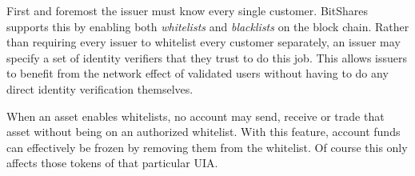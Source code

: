 First and foremost the issuer must know every single customer. BitShares
supports this by enabling both \emph{whitelists} and \emph{blacklists} on the
block chain. Rather than requiring every issuer to whitelist every customer
separately, an issuer may specify a set of identity verifiers that they trust
to do this job. This allows issuers to benefit from the network effect of
validated users without having to do any direct identity verification
themselves.

When an asset enables whitelists, no account may send, receive or trade that
asset without being on an authorized whitelist. With this feature, account
funds can effectively be frozen by removing them from the whitelist. Of course
this only affects those tokens of that particular UIA.
